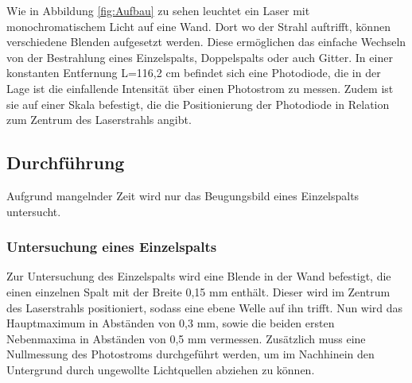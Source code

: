 \documentclass[titlepage = firstcover]{scrartcl}
\begin{document}
            \FloatBarrier
        
            \noindent

            Wie in Abbildung \ref{fig:Aufbau} zu sehen leuchtet ein Laser mit monochromatischem Licht auf eine Wand. Dort wo der Strahl auftrifft, können verschiedene Blenden aufgesetzt werden. Diese
            ermöglichen das einfache Wechseln von der Bestrahlung eines Einzelspalts, Doppelspalts oder auch Gitter. In einer konstanten Entfernung L=116,2 cm befindet sich eine Photodiode, die in der Lage
            ist die einfallende Intensität über einen Photostrom zu messen. Zudem ist sie auf einer Skala befestigt, die die Positionierung der Photodiode in Relation zum Zentrum des Laserstrahls
            angibt.
            
        \newpage
        \subsection{Durchführung}
            Aufgrund mangelnder Zeit wird nur das Beugungsbild eines Einzelspalts untersucht.
            \subsubsection*{Untersuchung eines Einzelspalts}
                Zur Untersuchung des Einzelspalts wird eine Blende in der Wand befestigt, die einen einzelnen Spalt mit der Breite 0,15 mm enthält. Dieser wird im Zentrum des
                Laserstrahls positioniert, sodass eine ebene Welle auf ihn trifft. Nun wird das Hauptmaximum in Abständen von 0,3 mm, sowie die beiden ersten Nebenmaxima in Abständen von 0,5 mm 
                vermessen. Zusätzlich muss eine Nullmessung des Photostroms durchgeführt werden, um im Nachhinein den Untergrund durch ungewollte Lichtquellen abziehen zu können. 


                    






                    
\end{document}
